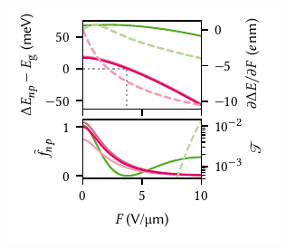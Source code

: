 \begin{marginfigure}
    \centering
    \includegraphics{img/pdf/experiment/qcse_field_dependence}
    \caption[]{
        Electric field dependence of the \gls{qcse} for the first two energy levels in the \gls{qw}.
        Top: the ground state energy (magenta) shows the expected quadratic dependence; the confinement energy is compensated at around $F=\qty{3.7}{\volt\per\micro\meter}$.
        Dashed lines (right axis) show the derivative, revealing that the excited state is actually raised in energy at low fields.
        Bottom: oscillator strengths (same color code as above).
        Despite the fact that the wavefunctions are pulled apart by the electric field, the oscillator strength of the ground state has a maximum at around \qty{2.5}{\volt\per\micro\meter}.
        Dashed lines (right axis) show the tunneling probability through the barrier.
        Only the excited electron state is appreciably non-zero at large fields.
    }
    \label{fig:exp:theory:qcse:field}
\end{marginfigure}

